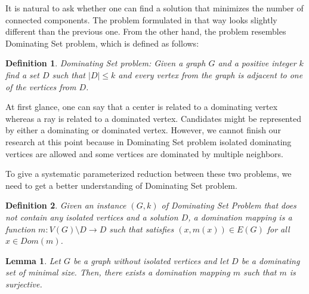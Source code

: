 \documentclass[en]{pracamgr}
\newtheorem{definition}{Definition}
\newtheorem{lemma}{Lemma}
\newcommand{\domsetp}{{\sc Dominating Set} problem}
\begin{document}
It is natural to ask whether one can find a solution that minimizes the number of connected components. The problem formulated in that way looks slightly different than the previous one. From the other hand, the problem resembles \domsetp{}, which is defined as follows:

\begin{definition}
	\domsetp: Given a graph $G$ and a positive integer $k$ find a set $D$ such that $|D| \leq k$ and every vertex from the graph is adjacent to one of the vertices from $D$.
\end{definition}

At first glance, one can say that a center is related to a dominating vertex whereas a ray is related to a dominated vertex. Candidates might be represented by either a dominating or dominated vertex. However, we cannot finish our research at this point because in \domsetp{} isolated dominating vertices are allowed and some vertices are dominated by multiple neighbors. 

To give a systematic parameterized reduction between these two problems, we need to get a better understanding of \domsetp{}.

\begin{definition}
	Given an instance $(G,k)$ of Dominating Set Problem that does not contain any isolated vertices and a solution $D$, a {\normalfont domination mapping} is a function $m:V(G) \setminus D \rightarrow D$ such that satisfies $(x,m(x)) \in E(G)$ for all $x \in Dom(m)$.
\end{definition}

\begin{lemma}\label{dom mapping}
	Let $G$ be a graph without isolated vertices and let $D$ be a dominating set of minimal size. Then, there exists a domination mapping $m$ such that $m$ is surjective.
\end{lemma}
\end{document}
